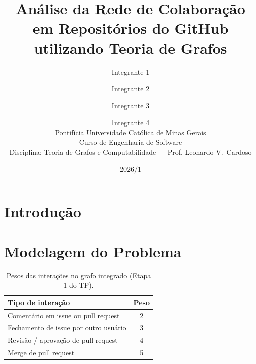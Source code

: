 \documentclass[a4paper,11pt]{article}
\title{
  Análise da Rede de Colaboração em Repositórios do GitHub\\
  utilizando Teoria de Grafos
}
\author{
  Integrante 1 \and
  Integrante 2 \and
  Integrante 3 \and
  Integrante 4 \\[1ex]
  \small Pontifícia Universidade Católica de Minas Gerais\\
  \small Curso de Engenharia de Software\\
  \small Disciplina: Teoria de Grafos e Computabilidade — Prof. Leonardo V.\ Cardoso
}
\date{2026/1}
\begin{document}
\maketitle

\begin{abstract}
\end{abstract}

\section{Introdução}\label{sec:intro}

%

\section{Modelagem do Problema}\label{sec:modelagem}

%

\begin{table}[h]
  \centering
  \caption{Pesos das interações no grafo integrado (Etapa 1 do TP).}
  \label{tab:pesos}
  \begin{tabular}{lc}
    \toprule
    \textbf{Tipo de interação} & \textbf{Peso} \\
    \midrule
    Comentário em issue ou pull request           & 2 \\
    Fechamento de issue por outro usuário         & 3 \\
    Revisão / aprovação de pull request           & 4 \\
    Merge de pull request                         & 5 \\
    \bottomrule
  \end{tabular}
\end{table}
\end{document}
